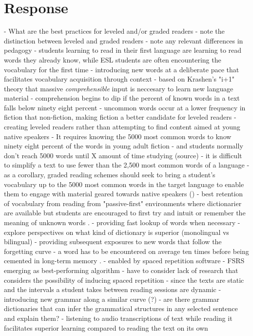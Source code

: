 \documentclass[
	letterpaper, %
]{jdf}
\begin{document}
\section{Response}

- What are the best practices for leveled and/or graded readers
  - note the distinction between leveled and graded readers
    - note any relevant differences in pedagogy
      - students learning to read in their first language are learning to read words they already know, while ESL students are often encountering the vocabulary for the first time \cite{hu_2000}
  - introducing new words at a deliberate pace that facilitates vocabulary acquisition through context
    - based on Krashen's "i+1" theory that massive \textit{comprehensible} input is neccesary to learn new language material \cite{krashenreview}
    - comprehension begins to dip if the percent of known words in a text falls below ninety eight percent \cite{hu_2000}
    - uncommon words occur at a lower frequency in fiction that non-fiction, making fiction a better candidate for leveled readers \cite{hu_2000}
  - creating leveled readers rather than attempting to find content aimed at young native speakers
    - It requires knowing the 5000 most common words to know ninety eight percent of the words in young adult fiction \cite{nation1992vocabulary}
      - and students normally don't reach 5000 words until X amount of time studying (source)
    - it is difficult to simplify a text to use fewer than the 2,500 most common words of a language \cite{nation1992vocabulary}
    - as a corollary, graded reading schemes should seek to bring a student's vocabulary up to the 5000 most common words in the target language to enable them to engage with material geared towards native speakers (\cite{Nation2020GradedRA})
  - best retention of vocabulary from reading from "passive-first" environments where dictionarier are available but students are encouraged to first try and intuit or remember the meaning of unknown words \cite{mcdonald2016}.
    - providing fast lookup of words when necessary
    - explore perspectives on what kind of dictionary is superior (monolingual vs bilingual)
  - providing subsequent exposures to new words that follow the forgetting curve
    - a word has to be encountered on average ten times before being cemented in long-term memory \cite{Nation2020GradedRA}.
    - enabled by spaced repetition software
      - FSRS emerging as best-performing algorithm \cite{shortestpathrepetitionscheduling}
    - have to consider lack of research that considers the possibility of inducing spaced repetition
      - since the texts are static and the intervals a student takes between reading sessions are dynamic
  - introducing new grammar along a similar curve (?)
    - are there grammar dictionaries that can infer the grammatical structures in any selected sentence and explain them?
  - listening to audio transcriptions of text while reading it facilitates superior learning compared to reading the text on its own \cite{Chang2015ImprovingRR}
      
\end{document}
